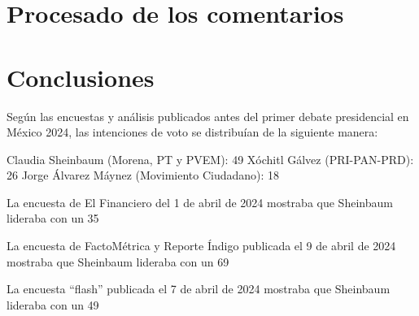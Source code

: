 \chapter{Procesado de los comentarios}



\chapter{Conclusiones}

Según las encuestas y análisis publicados antes del primer debate presidencial en México 2024, las intenciones de voto se distribuían de la siguiente manera:

Claudia Sheinbaum (Morena, PT y PVEM): 49%
Xóchitl Gálvez (PRI-PAN-PRD): 26%
Jorge Álvarez Máynez (Movimiento Ciudadano): 18%


La encuesta de El Financiero del 1 de abril de 2024 mostraba que Sheinbaum lideraba con un 35%

La encuesta de FactoMétrica y Reporte Índigo publicada el 9 de abril de 2024 mostraba que Sheinbaum lideraba con un 69%

La encuesta “flash” publicada el 7 de abril de 2024 mostraba que Sheinbaum lideraba con un 49%